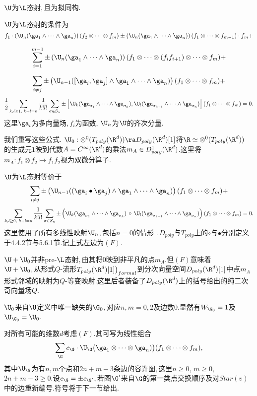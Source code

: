 \begin{thm}
$\U$为$\L$态射,\,且为拟同构.
\end{thm}

$\U$为$\L$态射的条件为
$$
    f_1\cdot\left(\U_n(\ga_1\wedge\dots\wedge \ga_n)\right)
    (f_2\otimes\dots\otimes f_m)\pm \left(\U_n(\ga_1\wedge\dots\wedge 
    \ga_n)\right)
    (f_1\otimes\dots\otimes f_{m-1})\cdot f_m+$$
    
    $$\sum_{i=1}^{m-1} \pm\left(\U_n(\ga_1\wedge\dots\wedge \ga_n)\right)
      (f_1\otimes\dots \otimes (f_i f_{i+1})\otimes\dots\otimes f_m)
      +$$
      
    $$\sum_{i\ne j}\pm 
  \left(\U_{n-1}([\ga_i,\ga_j]\wedge \ga_1\wedge\dots\wedge \ga_n)
  \right)(f_1\otimes\dots\otimes f_m)+$$
  $$
 {1\over 2}
  \sum_{k,l\ge 1,\,\,k+l=n} {1\over k! l!}\sum_{\sigma\in S_n}
\pm \left[\U_k(\ga_{\sigma_1}\wedge\dots\wedge\ga_{\sigma_k}),
\U_l(\ga_{\sigma_{k+1}}\wedge
\dots\wedge \ga_{\sigma_n})\right](f_1\otimes \dots\otimes f_m)=0.$$
这里$\ga_i$为多向量场,\,$f_i$为函数,\,\,$\U_n$为$\U$的齐次分量.

我们重写这些公式.\,\,$\U_0:\otimes ^0(
      T_{poly}(\R^d))\ra D_{poly}(\R^d)[1]$将$\R\simeq
     \otimes ^0(
      T_{poly}(\R^d))$\\
的生成元$1$映到代数$A=C^{\infty}(\R^d)$的乘法$m_A\in D^1_{poly}(\R^d)$.这里将$m_A:f_1\otimes f_2\mapsto f_1 f_2$视为双微分算子.

$\U$为$\L$态射等价于
$$\sum_{i\ne j}\pm 
  \left(\U_{n-1}((\ga_i\bullet \ga_j)\wedge \ga_1\wedge\dots\wedge \ga_n)
  \right)(f_1\otimes\dots\otimes f_m)+$$
  $$
  \sum_{k,l\ge 0,\,\,k+l=n} {1\over k! l!}\sum_{\sigma\in S_n}
\pm \left(\U_k(\ga_{\sigma_1}\wedge\dots\wedge\ga_{\sigma_k})\,
\circ \,\U_l(\ga_{\sigma_{k+1}}\wedge
\dots\wedge \ga_{\sigma_n})\right)(f_1\otimes \dots\otimes f_m)=0.$$
这里使用了所有多线性映射$\U_n$,\,包括$n=0$的情形	.\,$D_{poly}$与$T_{poly}$上的$\circ$与$\bullet$分别定义于4.4.2节与5.6.1节.记上式左边为$(F)$.

$\U+\U_0$并非pre-$\L$态射,\,由其将$0$映到非平凡的点$m_A$.但$(F)$意味着\\$\U+\U_0$,\,从形式$Q$-流形$T_{poly}(\R^d)[1]\bigr)_{formal}$到分次向量空间$D_{poly}(\R^d)[1]$中点$m_A$形式邻域的映射为$Q$-等变映射.这里后者装备了$D_{poly}(\R^d)$上的括号给出的纯二次奇向量场$Q$.

$\U_0$来自$\U$定义中唯一缺失的$\G_0$,\,对应$n,m=0,2$及边数$0$.显然有$W_{\G_0}=1$及$\U_{\G_0}=\U_0$.

对所有可能的维数$d$考虑$(F)$.其可写为线性组合
$$\sum_\G c_\G \cdot\U_\G\bigl(\ga_1\otimes\dots\otimes\ga_n)\bigr)(
  f_1\otimes\dots\otimes f_m),$$
其中$\U_\G$为有$n,m$个点和$2n+m-3$条边的容许图,\,这里$n\ge 0$,\,\,$m\ge 0$,\,\,$2n+m-3\ge 0$.设$c_\G=\pm c_{\G'}$,\,若图$\G'$来自$\G$的第一类点交换顺序及对$Star(v)$中的边重新编号.符号将于下一节给出.

